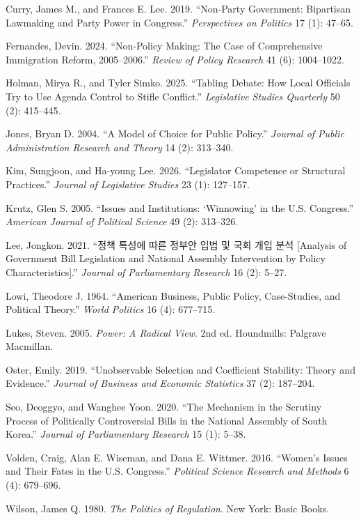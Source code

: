 \documentclass[11pt]{article}
\begin{document}
\begin{description}
\item Curry, James M., and Frances E. Lee. 2019. ``Non-Party Government: Bipartisan Lawmaking and Party Power in Congress.'' \textit{Perspectives on Politics} 17 (1): 47--65.

\item Fernandes, Devin. 2024. ``Non-Policy Making: The Case of Comprehensive Immigration Reform, 2005--2006.'' \textit{Review of Policy Research} 41 (6): 1004--1022.

\item Holman, Mirya R., and Tyler Simko. 2025. ``Tabling Debate: How Local Officials Try to Use Agenda Control to Stifle Conflict.'' \textit{Legislative Studies Quarterly} 50 (2): 415--445.

\item Jones, Bryan D. 2004. ``A Model of Choice for Public Policy.'' \textit{Journal of Public Administration Research and Theory} 14 (2): 313--340.

\item Kim, Sungjoon, and Ha-young Lee. 2026. ``Legislator Competence or Structural Practices.'' \textit{Journal of Legislative Studies} 23 (1): 127--157.

\item Krutz, Glen S. 2005. ``Issues and Institutions: `Winnowing' in the U.S. Congress.'' \textit{American Journal of Political Science} 49 (2): 313--326.

\item Lee, Jongkon. 2021. ``정책 특성에 따른 정부안 입법 및 국회 개입 분석 [Analysis of Government Bill Legislation and National Assembly Intervention by Policy Characteristics].'' \textit{Journal of Parliamentary Research} 16 (2): 5--27.

\item Lowi, Theodore J. 1964. ``American Business, Public Policy, Case-Studies, and Political Theory.'' \textit{World Politics} 16 (4): 677--715.

\item Lukes, Steven. 2005. \textit{Power: A Radical View}. 2nd ed. Houndmills: Palgrave Macmillan.

\item Oster, Emily. 2019. ``Unobservable Selection and Coefficient Stability: Theory and Evidence.'' \textit{Journal of Business and Economic Statistics} 37 (2): 187--204.

\item Seo, Deoggyo, and Wanghee Yoon. 2020. ``The Mechanism in the Scrutiny Process of Politically Controversial Bills in the National Assembly of South Korea.'' \textit{Journal of Parliamentary Research} 15 (1): 5--38.

\item Volden, Craig, Alan E. Wiseman, and Dana E. Wittmer. 2016. ``Women's Issues and Their Fates in the U.S. Congress.'' \textit{Political Science Research and Methods} 6 (4): 679--696.

\item Wilson, James Q. 1980. \textit{The Politics of Regulation}. New York: Basic Books.

\end{description}
\end{document}
